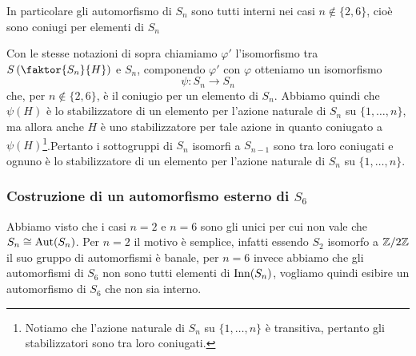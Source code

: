\documentclass[11pt]{scrartcl}
\begin{document}
\begin{remark}
    In particolare gli automorfismo di $S_n$ sono tutti interni nei casi $n \notin \{2, 6\}$,
    cioè sono coniugi per elementi di $S_n$
\end{remark}

Con le stesse notazioni di sopra chiamiamo $\varphi'$ l'isomorfismo tra
$S\left(\faktor{S_n}{H}\right)$ e $S_n$, componendo $\varphi'$ con $\varphi$ 
otteniamo un isomorfismo
\[
    \psi :S_n \longrightarrow S_n
\]
che, per $n \notin \{2, 6\}$, è il coniugio per un elemento di $S_n$. Abbiamo
quindi che $\psi(H)$ è lo stabilizzatore di un elemento per l'azione naturale
di $S_n$ su $\{1, \ldots, n\}$, ma allora anche $H$ è uno stabilizzatore per tale
azione in quanto coniugato a $\psi(H)$\footnote{
    Notiamo che l'azione naturale di $S_n$ su $\{1, \ldots, n\}$ è transitiva,
    pertanto gli stabilizzatori sono tra loro coniugati.
}.Pertanto i sottogruppi di $S_n$ isomorfi a $S_{n - 1}$ sono tra loro coniugati
e ognuno è lo stabilizzatore di un elemento per l'azione naturale di $S_n$
su $\{1, \ldots, n\}$.

\subsubsection{Costruzione di un automorfismo esterno di $S_6$}

Abbiamo visto che i casi $n = 2$ e $n = 6$ sono gli unici per cui non vale 
che $S_n \cong \operatorname{Aut}(S_n)$. Per $n = 2$ il motivo è semplice, infatti essendo
$S_2$ isomorfo a $\mathbb{Z}/{2}\mathbb{Z}$ il suo gruppo di automorfismi è banale, per $n = 6$
invece abbiamo che gli automorfismi di $S_6$ non sono tutti elementi di $\operatorname{Inn}(S_n)$,
vogliamo quindi esibire un automorfismo di $S_6$ che non sia interno.\newline
\end{document}
